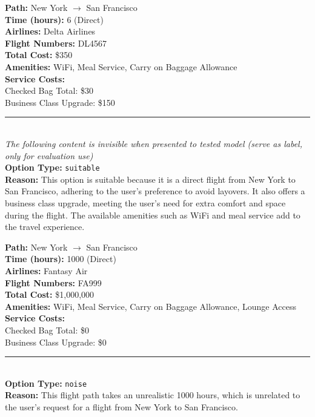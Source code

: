 {\small
\begin{tcolorbox}[colback=gray!5!white, colframe=black!75!black, 
title=Correct Option Example: Flight Option F14, boxrule=0.3mm, width=0.48\textwidth, arc=3mm, auto outer arc=true]

\textbf{Path:} New York $\rightarrow$ San Francisco \\
\textbf{Time (hours):} 6 (Direct) \\
\textbf{Airlines:} Delta Airlines \\
\textbf{Flight Numbers:} DL4567 \\
\textbf{Total Cost:} \$350 \\
\textbf{Amenities:} WiFi, Meal Service, Carry on Baggage Allowance \\
\textbf{Service Costs:} \\
\hspace*{4mm}Checked Bag Total: \$30 \\
\hspace*{4mm}Business Class Upgrade: \$150 \\
\rule{\linewidth}{0.2pt} \\[2mm]
\textit{The following content is invisible when presented to tested model (serve as label, only for evaluation use)} \\[2mm]
\textbf{Option Type:} \texttt{suitable} \\
\textbf{Reason:} This option is suitable because it is a direct flight from New York to San Francisco, adhering to the user's preference to avoid layovers. It also offers a business class upgrade, meeting the user's need for extra comfort and space during the flight. The available amenities such as WiFi and meal service add to the travel experience.
\end{tcolorbox}
}

{\small
\begin{tcolorbox}[colback=gray!5!white, colframe=black!75!black, 
title=Noise Option Example: Flight Option F10, boxrule=0.3mm, width=0.48\textwidth, arc=3mm, auto outer arc=true]

\textbf{Path:} New York $\rightarrow$ San Francisco \\
\textbf{Time (hours):} 1000 (Direct) \\
\textbf{Airlines:} Fantasy Air \\
\textbf{Flight Numbers:} FA999 \\
\textbf{Total Cost:} \$1{,}000{,}000 \\
\textbf{Amenities:} WiFi, Meal Service, Carry on Baggage Allowance, Lounge Access \\
\textbf{Service Costs:} \\
\hspace*{4mm}Checked Bag Total: \$0 \\
\hspace*{4mm}Business Class Upgrade: \$0 \\
\rule{\linewidth}{0.2pt} \\[2mm]
\textbf{Option Type:} \texttt{noise} \\
\textbf{Reason:} This flight path takes an unrealistic 1000 hours, which is unrelated to the user's request for a flight from New York to San Francisco.
\end{tcolorbox}
}

